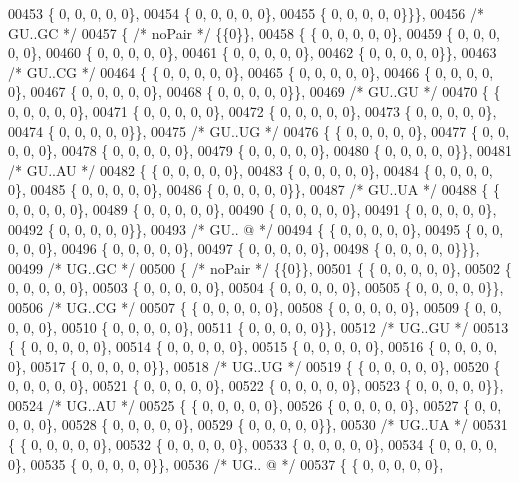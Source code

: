 \begin{DoxyCode}
00453 \{  0, 0, 0, 0, 0\},
00454 \{  0, 0, 0, 0, 0\},
00455 \{  0, 0, 0, 0, 0\}\}\},
00456  \textcolor{comment}{/* GU..GC */}
00457 \{ \textcolor{comment}{/* noPair */} \{\{0\}\},
00458 \{ \{  0, 0, 0, 0, 0\},
00459 \{  0, 0, 0, 0, 0\},
00460 \{  0, 0, 0, 0, 0\},
00461 \{  0, 0, 0, 0, 0\},
00462 \{  0, 0, 0, 0, 0\}\},
00463  \textcolor{comment}{/* GU..CG */}
00464 \{ \{  0, 0, 0, 0, 0\},
00465 \{  0, 0, 0, 0, 0\},
00466 \{  0, 0, 0, 0, 0\},
00467 \{  0, 0, 0, 0, 0\},
00468 \{  0, 0, 0, 0, 0\}\},
00469  \textcolor{comment}{/* GU..GU */}
00470 \{ \{  0, 0, 0, 0, 0\},
00471 \{  0, 0, 0, 0, 0\},
00472 \{  0, 0, 0, 0, 0\},
00473 \{  0, 0, 0, 0, 0\},
00474 \{  0, 0, 0, 0, 0\}\},
00475  \textcolor{comment}{/* GU..UG */}
00476 \{ \{  0, 0, 0, 0, 0\},
00477 \{  0, 0, 0, 0, 0\},
00478 \{  0, 0, 0, 0, 0\},
00479 \{  0, 0, 0, 0, 0\},
00480 \{  0, 0, 0, 0, 0\}\},
00481  \textcolor{comment}{/* GU..AU */}
00482 \{ \{  0, 0, 0, 0, 0\},
00483 \{  0, 0, 0, 0, 0\},
00484 \{  0, 0, 0, 0, 0\},
00485 \{  0, 0, 0, 0, 0\},
00486 \{  0, 0, 0, 0, 0\}\},
00487  \textcolor{comment}{/* GU..UA */}
00488 \{ \{  0, 0, 0, 0, 0\},
00489 \{  0, 0, 0, 0, 0\},
00490 \{  0, 0, 0, 0, 0\},
00491 \{  0, 0, 0, 0, 0\},
00492 \{  0, 0, 0, 0, 0\}\},
00493  \textcolor{comment}{/* GU.. @ */}
00494 \{ \{  0, 0, 0, 0, 0\},
00495 \{  0, 0, 0, 0, 0\},
00496 \{  0, 0, 0, 0, 0\},
00497 \{  0, 0, 0, 0, 0\},
00498 \{  0, 0, 0, 0, 0\}\}\},
00499  \textcolor{comment}{/* UG..GC */}
00500 \{ \textcolor{comment}{/* noPair */} \{\{0\}\},
00501 \{ \{  0, 0, 0, 0, 0\},
00502 \{  0, 0, 0, 0, 0\},
00503 \{  0, 0, 0, 0, 0\},
00504 \{  0, 0, 0, 0, 0\},
00505 \{  0, 0, 0, 0, 0\}\},
00506  \textcolor{comment}{/* UG..CG */}
00507 \{ \{  0, 0, 0, 0, 0\},
00508 \{  0, 0, 0, 0, 0\},
00509 \{  0, 0, 0, 0, 0\},
00510 \{  0, 0, 0, 0, 0\},
00511 \{  0, 0, 0, 0, 0\}\},
00512  \textcolor{comment}{/* UG..GU */}
00513 \{ \{  0, 0, 0, 0, 0\},
00514 \{  0, 0, 0, 0, 0\},
00515 \{  0, 0, 0, 0, 0\},
00516 \{  0, 0, 0, 0, 0\},
00517 \{  0, 0, 0, 0, 0\}\},
00518  \textcolor{comment}{/* UG..UG */}
00519 \{ \{  0, 0, 0, 0, 0\},
00520 \{  0, 0, 0, 0, 0\},
00521 \{  0, 0, 0, 0, 0\},
00522 \{  0, 0, 0, 0, 0\},
00523 \{  0, 0, 0, 0, 0\}\},
00524  \textcolor{comment}{/* UG..AU */}
00525 \{ \{  0, 0, 0, 0, 0\},
00526 \{  0, 0, 0, 0, 0\},
00527 \{  0, 0, 0, 0, 0\},
00528 \{  0, 0, 0, 0, 0\},
00529 \{  0, 0, 0, 0, 0\}\},
00530  \textcolor{comment}{/* UG..UA */}
00531 \{ \{  0, 0, 0, 0, 0\},
00532 \{  0, 0, 0, 0, 0\},
00533 \{  0, 0, 0, 0, 0\},
00534 \{  0, 0, 0, 0, 0\},
00535 \{  0, 0, 0, 0, 0\}\},
00536  \textcolor{comment}{/* UG.. @ */}
00537 \{ \{  0, 0, 0, 0, 0\},

\end{DoxyCode}
